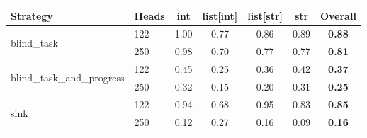\begin{tabular}{llccccc}
\toprule
Strategy & Heads & int & list{[}int{]} & list{[}str{]} & str & Overall \\
\midrule
\multirow{2}{*}{blind\_task} & 122 & 1.00 & 0.77 & 0.86 & 0.89 & \textbf{0.88} \\
 & 250 & 0.98 & 0.70 & 0.77 & 0.77 & \textbf{0.81} \\
\midrule
\multirow{2}{*}{blind\_task\_and\_progress} & 122 & 0.45 & 0.25 & 0.36 & 0.42 & \textbf{0.37} \\
 & 250 & 0.32 & 0.15 & 0.20 & 0.31 & \textbf{0.25} \\
\midrule
\multirow{2}{*}{sink} & 122 & 0.94 & 0.68 & 0.95 & 0.83 & \textbf{0.85} \\
 & 250 & 0.12 & 0.27 & 0.16 & 0.09 & \textbf{0.16} \\
\bottomrule
\end{tabular}
